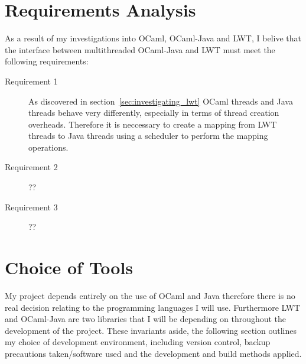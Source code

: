 \documentclass[12pt,twoside,notitlepage]{report}
\begin{document}
\section{Requirements Analysis}
\label{sec:requirements_analysis}
%
%
As a result of my investigations into OCaml, OCaml-Java and LWT, I belive that the interface between multithreaded OCaml-Java and LWT must meet the following requirements:

\begin{description}
\item[Requirement 1]

As discovered in section~\ref{sec:investigating_lwt} OCaml threads and Java threads behave very differently, especially in terms of thread creation overheads. Therefore it is neccessary to create a mapping from LWT threads to Java
threads using a scheduler to perform the mapping operations.

\item[Requirement 2]
??

\item[Requirement 3]
??
\end{description}

\section{Choice of Tools}
\label{sec:choice_of_tools}
%
%
My project depends entirely on the use of OCaml and Java therefore there is no real decision relating to the programming languages I will use. Furthermore LWT and OCaml-Java are two libraries that I will be depending on throughout the
development of the project. These invariants aside, the following section outlines my choice of development environment, including version control, backup precautions taken/software used and the development and build methods applied.
\end{document}
